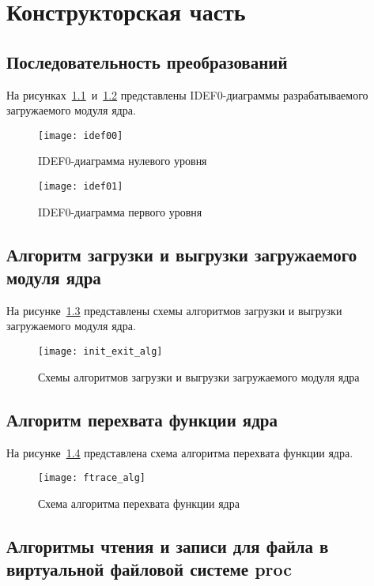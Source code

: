 \chapter{Конструкторская часть}

\section{Последовательность преобразований}

На рисунках~\ref{idef00}~и~\ref{idef01} представлены IDEF0-диаграммы разрабатываемого загружаемого модуля ядра.
\begin{figure}[H]
	\centering
	\texttt{[image: idef00]}
	\caption{IDEF0-диаграмма нулевого уровня}
	\label{idef00}
\end{figure}
\begin{figure}[H]
	\centering
	\texttt{[image: idef01]}
	\caption{IDEF0-диаграмма первого уровня}
	\label{idef01}
\end{figure}

\section{Алгоритм загрузки и выгрузки загружаемого модуля ядра}

На рисунке~\ref{init_exit_alg} представлены схемы алгоритмов загрузки и выгрузки загружаемого модуля ядра.
\begin{figure}[H]
	\centering
	\texttt{[image: init\_exit\_alg]}
	\caption{Схемы алгоритмов загрузки и выгрузки загружаемого модуля ядра}
	\label{init_exit_alg}
\end{figure}

\section{Алгоритм перехвата функции ядра}

На рисунке~\ref{ftrace_alg} представлена схема алгоритма перехвата функции ядра.
\begin{figure}[H]
	\centering
	\texttt{[image: ftrace\_alg]}
	\caption{Схема алгоритма перехвата функции ядра}
	\label{ftrace_alg}
\end{figure}

\section{Алгоритмы чтения и записи для файла в виртуальной файловой системе proc}

